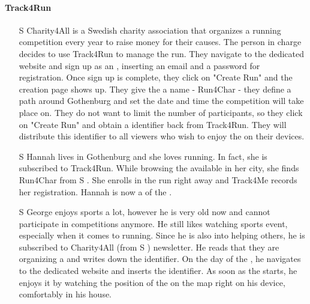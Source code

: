 \documentclass[../../rasd.tex]{subfiles}
\begin{document}
            \paragraph{Track4Run}
                \begin{itemize}
                    \item[S\subs{8}] Charity4All is a Swedish charity association that organizes a running competition every year to raise money for their causes. The person in charge decides to use Track4Run to manage the run. They navigate to the  dedicated website and sign up as an , inserting an email and a password for registration. Once sign up is complete, they click on "Create Run" and the  creation page shows up. They give the  a name - Run4Char - they define a path around Gothenburg and set the date and time the competition will take place on. They do not want to limit the number of participants, so they click on "Create Run" and obtain a  identifier back from Track4Run. They will distribute this identifier to all viewers who wish to enjoy the  on their devices.

                    \item[S\subs{9}] Hannah lives in Gothenburg and she loves running. In fact, she is subscribed to Track4Run. While browsing the available  in her city, she finds Run4Char from S . She enrolls in the run right away and Track4Me records her registration. Hannah is now a  of the .  

                    \item[S\subs{10}] George enjoys sports a lot, however he is very old now and cannot participate in competitions anymore. He still likes watching sports event, especially when it comes to running. Since he is also into helping others, he is subscribed to Charity4All (from S ) newsletter. He reads that they are organizing a  and writes down the  identifier. On the day of the , he navigates to the  dedicated website and inserts the  identifier. As soon as the  starts, he enjoys it by watching the position of the  on the map right on his device, comfortably in his house.
                \end{itemize}
\end{document}
